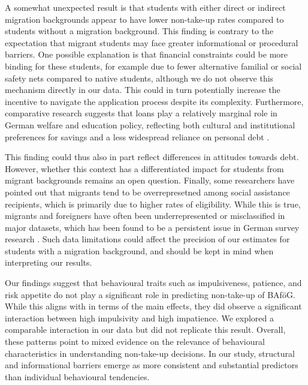 A somewhat unexpected result is that students with either direct or indirect migration backgrounds appear to have lower non-take-up rates compared to students without a migration background. This finding is contrary to the expectation that migrant students may face greater informational or procedural barriers. One possible explanation is that financial constraints could be more binding for these students, for example due to fewer alternative familial or social safety nets compared to native students, although we do not observe this mechanism directly in our data. This could in turn potentially increase the incentive to navigate the application process despite its complexity. Furthermore, comparative research suggests that loans play a relatively marginal role in German welfare and education policy, reflecting both cultural and institutional preferences for savings and a less widespread reliance on personal debt \citep{seabrooke_germany_2017}. 

This finding could thus also in part reflect differences in attitudes towards debt. However, whether this context has a differentiated impact for students from migrant backgrounds remains an open question. Finally, some researchers have pointed out that migrants tend to be overrepresetned among social assistance recipients, which is primarily due to higher rates of eligibility. While this is true, migrants and foreigners have often been underrepresented or misclassified in major datasets, which has been found to be a persistent issue in German survey research \citep{frick_claim_2007, liebaut_surveying_2016}. Such data limitations could affect the precision of our estimates for students with a migration background, and should be kept in mind when interpreting our results.


Our findings suggest that behavioural traits such as impulsiveness, patience, and risk appetite do not play a significant role in predicting non-take-up of BAföG. 
While this aligns with \cite{herber_non-take-up_2019} in terms of the main effects, they did observe a significant interaction between high impulsivity and high impatience. 
We explored a comparable interaction in our data but did not replicate this result.
Overall, these patterns point to mixed evidence on the relevance of behavioural characteristics in understanding non-take-up decisions. In our study, structural and informational barriers emerge as more consistent and substantial predictors than individual behavioural tendencies.

